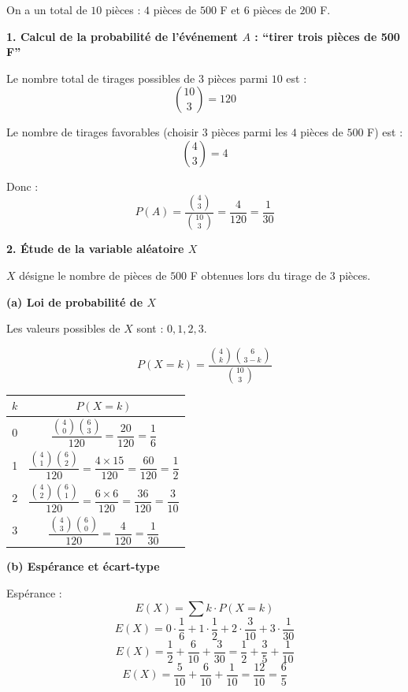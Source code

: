 \documentclass[12pt,a4paper]{article}
\newcounter{correction}
\begin{document}
\begin{correction}
On a un total de $10$ pièces : $4$ pièces de $500$ F et $6$ pièces de $200$ F.

\bigskip

\textbf{1. Calcul de la probabilité de l'événement $A$ : ``tirer trois pièces de 500 F''}

Le nombre total de tirages possibles de $3$ pièces parmi $10$ est :
\[
\binom{10}{3} = 120
\]

Le nombre de tirages favorables (choisir $3$ pièces parmi les $4$ pièces de $500$ F) est :
\[
\binom{4}{3} = 4
\]

Donc :
\[
P(A) = \frac{\binom{4}{3}}{\binom{10}{3}} = \frac{4}{120} = \frac{1}{30}
\]

\bigskip

\textbf{2. Étude de la variable aléatoire $X$}

$X$ désigne le nombre de pièces de $500$ F obtenues lors du tirage de $3$ pièces.

\medskip

\textbf{(a) Loi de probabilité de $X$}

Les valeurs possibles de $X$ sont : $0, 1, 2, 3$.

\[
P(X = k) = \frac{\binom{4}{k} \binom{6}{3-k}}{\binom{10}{3}}
\]

\begin{center}
\begin{tabular}{|c|c|}
\hline
$k$ & $P(X = k)$ \\
\hline
0 & $\dfrac{\binom{4}{0}\binom{6}{3}}{120} = \dfrac{20}{120} = \dfrac{1}{6}$ \\
\hline
1 & $\dfrac{\binom{4}{1}\binom{6}{2}}{120} = \dfrac{4 \times 15}{120} = \dfrac{60}{120} = \dfrac{1}{2}$ \\
\hline
2 & $\dfrac{\binom{4}{2}\binom{6}{1}}{120} = \dfrac{6 \times 6}{120} = \dfrac{36}{120} = \dfrac{3}{10}$ \\
\hline
3 & $\dfrac{\binom{4}{3}\binom{6}{0}}{120} = \dfrac{4}{120} = \dfrac{1}{30}$ \\
\hline
\end{tabular}
\end{center}

\bigskip

\textbf{(b) Espérance et écart-type}

\medskip

Espérance :
\[
E(X) = \sum k \cdot P(X=k)
\]
\[
E(X) = 0 \cdot \frac{1}{6} + 1 \cdot \frac{1}{2} + 2 \cdot \frac{3}{10} + 3 \cdot \frac{1}{30}
\]
\[
E(X) = \frac{1}{2} + \frac{6}{10} + \frac{3}{30} = \frac{1}{2} + \frac{3}{5} + \frac{1}{10}
\]
\[
E(X) = \frac{5}{10} + \frac{6}{10} + \frac{1}{10} = \frac{12}{10} = \frac{6}{5}
\]


\end{correction}
\end{document}
